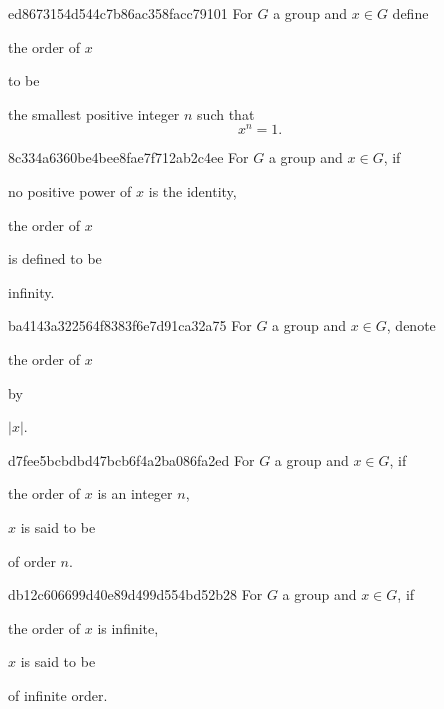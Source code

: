 \begin{note}{ed8673154d544c7b86ac358facc79101}
    For \({ G }\) a group and \({ x \in G }\)
    define \begin{icloze}{2}the order of \({ x }\)\end{icloze} to be
    \begin{icloze}{1}
        the smallest positive integer \({ n }\) such that
        \[
            x^{n} = 1.
        \]
    \end{icloze}
\end{note}

\begin{note}{8c334a6360be4bee8fae7f712ab2c4ee}
    For \({ G }\) a group and \({ x \in G }\), if \begin{icloze}{2}no positive power of \({ x }\) is the identity,\end{icloze} \begin{icloze}{3}the order of \({ x }\)\end{icloze} is defined to be \begin{icloze}{1}infinity.\end{icloze}
\end{note}

\begin{note}{ba4143a322564f8383f6e7d91ca32a75}
    For \({ G }\) a group and \({ x \in G }\), denote \begin{icloze}{2}the order of \({ x }\)\end{icloze} by \begin{icloze}{1}\({ \left\lvert x \right\rvert }\).\end{icloze}
\end{note}

\begin{note}{d7fee5bcbdbd47bcb6f4a2ba086fa2ed}
    For \({ G }\) a group and \({ x \in G }\), if \begin{icloze}{2}the order of \({ x }\) is an integer \({ n }\),\end{icloze} \({ x }\) is said to be \begin{icloze}{1}of order \({ n }\).\end{icloze}
\end{note}

\begin{note}{db12c606699d40e89d499d554bd52b28}
    For \({ G }\) a group and \({ x \in G }\), if \begin{icloze}{2}the order of \({ x }\) is infinite,\end{icloze} \({ x }\) is said to be \begin{icloze}{1}of infinite order.\end{icloze}
\end{note}

